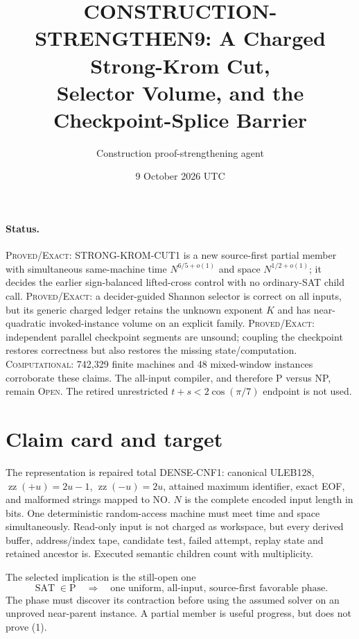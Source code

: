 \documentclass[11pt]{article}
\title{CONSTRUCTION-STRENGTHEN9: A Charged Strong-Krom Cut,\\Selector Volume, and the Checkpoint-Splice Barrier}
\author{Construction proof-strengthening agent}
\date{9 October 2026 UTC}
\newcommand{\SAT}{\operatorname{SAT}}
\begin{document}
\sloppy\maketitle

\paragraph{Status.}
\textsc{Proved/Exact}: \textsc{STRONG-KROM-CUT1} is a new source-first
partial member with simultaneous same-machine time
$N^{6/5+o(1)}$ and space $N^{1/2+o(1)}$; it decides the earlier
sign-balanced lifted-cross control with no ordinary-SAT child call.
\textsc{Proved/Exact}: a decider-guided Shannon selector is correct on all
inputs, but its generic charged ledger retains the unknown exponent $K$ and
has near-quadratic invoked-instance volume on an explicit family.
\textsc{Proved/Exact}: independent parallel checkpoint segments are
unsound; coupling the checkpoint restores correctness but also restores the
missing state/computation.  \textsc{Computational}: 742,329 finite machines
and 48 mixed-window instances corroborate these claims.  The all-input
compiler, and therefore P versus NP, remain \textsc{Open}.  The retired
unrestricted $t+s<2\cos(\pi/7)$ endpoint is not used.

\section{Claim card and target}
The representation is repaired total DENSE-CNF1: canonical ULEB128,
$\operatorname{zz}(+u)=2u-1$, $\operatorname{zz}(-u)=2u$, attained maximum
identifier, exact EOF, and malformed strings mapped to NO.  $N$ is the
complete encoded input length in bits.  One deterministic random-access
machine must meet time and space simultaneously.  Read-only input is not
charged as workspace, but every derived buffer, address/index tape,
candidate test, failed attempt, replay state and retained ancestor is.
Executed semantic children count with multiplicity.

The selected implication is the still-open one
\begin{equation}
 \SAT\in\mathrm P\quad\Longrightarrow\quad
 \text{one uniform, all-input, source-first favorable phase}.       \tag{1}
\end{equation}
The phase must discover its contraction before using the assumed solver on
an unproved near-parent instance.  A partial member is useful progress, but
does not prove (1).
\end{document}
